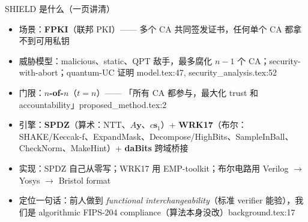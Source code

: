 \documentclass[aspectratio=169,10pt,fontset=none]{ctexbeamer}
\newcommand{\src}[1]{{\scriptsize\color{gray}#1}}
\begin{document}
\begin{frame}{SHIELD 是什么（一页讲清）}
\centering
{}
\vspace{.4em}
\begin{itemize}
  \item 场景：\textbf{FPKI}（联邦 PKI）—— 多个 CA 共同签发证书，任何单个 CA 都拿不到可用私钥
  \item 威胁模型：malicious、static、QPT 敌手，最多腐化 $n-1$ 个 CA；security-with-abort；quantum-UC 证明
        \src{model.tex:47, security\_analysis.tex:52}
  \item 门限：\textbf{$n$-of-$n$}（$t=n$）—— 「所有 CA 都参与，最大化 trust 和 accountability」\src{proposed\_method.tex:2}
  \item 引擎：\textbf{SPDZ}（算术：NTT、$A\mathbf y$、$c\mathbf s_1$）+ \textbf{WRK17}（布尔：SHAKE/Keccak-f、ExpandMask、Decompose/HighBits、SampleInBall、CheckNorm、MakeHint）+ \textbf{daBits} 跨域桥接
  \item 实现：SPDZ 自己从零写；WRK17 用 EMP-toolkit；布尔电路用 Verilog $\to$ Yosys $\to$ Bristol format
  \item 定位一句话：前人做到 \emph{functional interchangeability}（标准 verifier 能验），我们是 \alert{algorithmic FIPS-204 compliance}（算法本身没改）\src{background.tex:17}
\end{itemize}
\end{frame}
\end{document}
